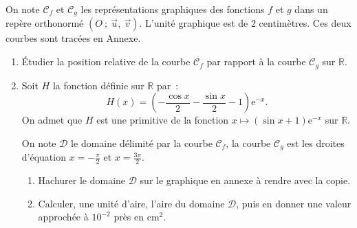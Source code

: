 \medbreak
{}
\smallbreak
\par
\par
On note $\mathscr{C}_f$ et $\mathscr{C}_g$ les représentations graphiques des fonctions $f$ et $g$ dans un repère orthonormé $(O~;~\overrightarrow{u},~\overrightarrow{v})$. L'unité graphique est de 2 centimètres. Ces deux courbes sont tracées en Annexe.
\begin{enumerate}
     \item Étudier la position relative de la courbe $\mathscr{C}_f$ par rapport à la courbe $\mathscr{C}_g$ sur $\mathbb{R}$.
     \item Soit $H$ la fonction définie sur $\mathbb{R}$ par~:
     \[
     H(x)=\left(-\frac{\cos x}{2}-\frac{\sin x}{2}-1\right)\text{e}^{-x}.
     \]
     On admet que $H$ est une primitive de la fonction $x\mapsto (\sin x+1)\text{e}^{-x}$ sur $\mathbb{R}$.
     \par
     On note $\mathscr{D}$ le domaine délimité par la courbe $\mathscr{C}_f$, la courbe $\mathscr{C}_g$ est les droites d'équation $x=-\frac{\pi}{2}$ et $x=\frac{3\pi}{2}$.
     \begin{enumerate}[label=\alph*.]
          \item Hachurer le domaine $\mathscr{D}$ sur le graphique en annexe à rendre avec la copie.
          \item Calculer, une unité d'aire, l'aire du domaine $\mathscr{D}$, puis en donner une valeur approchée à $10^{-2}$ près en cm$^2$.
     \end{enumerate}
\end{enumerate}
\newpage
